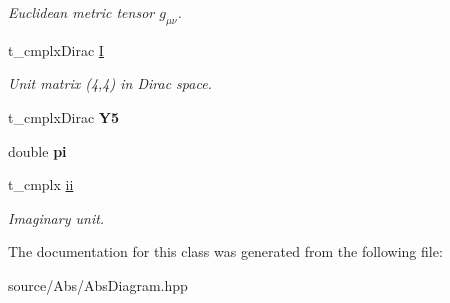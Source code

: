 \begin{DoxyCompactItemize}
\begin{DoxyCompactList}\small\item\em Euclidean metric tensor $ g_{\mu\nu} $. \end{DoxyCompactList}\item 
\hypertarget{class_c___abs_diagram_aff57681049aaff10af1fd2a0151209b8}{t\-\_\-cmplx\-Dirac \hyperlink{class_c___abs_diagram_aff57681049aaff10af1fd2a0151209b8}{I}}\label{class_c___abs_diagram_aff57681049aaff10af1fd2a0151209b8}

\begin{DoxyCompactList}\small\item\em Unit matrix (4,4) in Dirac space. \end{DoxyCompactList}\item 
\hypertarget{class_c___abs_diagram_a49ab5b499fd64c4a196349730d4beda3}{t\-\_\-cmplx\-Dirac {\bfseries Y5}}\label{class_c___abs_diagram_a49ab5b499fd64c4a196349730d4beda3}

\item 
\hypertarget{class_c___abs_diagram_a3e24081668fb3198fd043dd291fba4c5}{double {\bfseries pi}}\label{class_c___abs_diagram_a3e24081668fb3198fd043dd291fba4c5}

\item 
\hypertarget{class_c___abs_diagram_aa3cfb09af9c9e81fa1af3a78b5d667a7}{t\-\_\-cmplx \hyperlink{class_c___abs_diagram_aa3cfb09af9c9e81fa1af3a78b5d667a7}{ii}}\label{class_c___abs_diagram_aa3cfb09af9c9e81fa1af3a78b5d667a7}

\begin{DoxyCompactList}\small\item\em Imaginary unit. \end{DoxyCompactList}\end{DoxyCompactItemize}


The documentation for this class was generated from the following file\-:\begin{DoxyCompactItemize}
\item 
source/\-Abs/Abs\-Diagram.\-hpp\end{DoxyCompactItemize}
